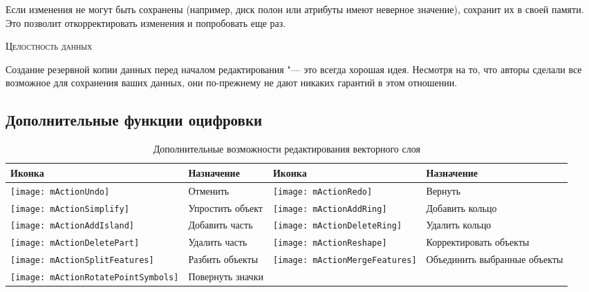 Если изменения не могут быть сохранены (например, диск полон или атрибуты
имеют неверное значение), \qg сохранит их в своей памяти. Это позволит
откорректировать изменения и попробовать еще раз.

\begin{Tip}\caption{\textsc{Целостность данных}}
Создание резервной копии данных перед началом редактирования "--- это
всегда хорошая идея. Несмотря на то, что авторы \qg сделали все возможное
для сохранения ваших данных, они по-прежнему не дают никаких гарантий в
этом отношении.
\end{Tip}

\subsection{Дополнительные функции оцифровки}
\label{sec:advanced_edit}

\begin{table}[h]
\centering
\small
\begin{tabular}{|l|p{6.9cm}|l|p{6.9cm}|}
\hline \textbf{Иконка} & \textbf{Назначение} & \textbf{Иконка} & \textbf{Назначение} \\
\hline \texttt{[image: mActionUndo]}
   & Отменить
   & \texttt{[image: mActionRedo]}
   & Вернуть \\
\hline \texttt{[image: mActionSimplify]}
   & Упростить объект
   & \texttt{[image: mActionAddRing]}
   & Добавить кольцо \\
\hline \texttt{[image: mActionAddIsland]}
   & Добавить часть
   & \texttt{[image: mActionDeleteRing]}
   & Удалить кольцо \\
\hline \texttt{[image: mActionDeletePart]}
   & Удалить часть
   & \texttt{[image: mActionReshape]}
   & Корректировать объекты \\
\hline \texttt{[image: mActionSplitFeatures]}
   & Разбить объекты
   & \texttt{[image: mActionMergeFeatures]}
   & Объединить выбранные объекты \\
\hline \texttt{[image: mActionRotatePointSymbols]}
   & Повернуть значки
   &
   & \\
\hline
\end{tabular}
\caption{Дополнительные возможности редактирования векторного слоя}\label{tab:advanced_editing}
\end{table}

